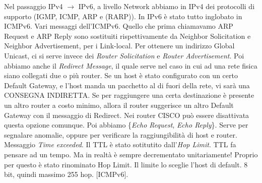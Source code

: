 Nel passaggio IPv4 $\rightarrow$ IPv6, a livello Network abbiamo in IPv4 dei protocolli di supporto (IGMP, ICMP, ARP e (RARP)). In IPv6 è stato tutto inglobato in ICMPv6. Vari messaggi dell'ICMPv6. Quello che prima chiamavamo ARP Request e ARP Reply sono sostituiti rispettivamente da Neighbor Solicitation e Neighbor Advertisement, per i Link-local. Per ottenere un indirizzo Global Unicast, ci si serve invece dei \textit{Router Solicitation} e \textit{Router Advertisement}. Poi abbiamo anche il \textit{Redirect Message}, il quale serve nel caso in cui ad una rete fisica siano collegati due o più router. Se un host è stato configurato con un certo Default Gateway, e l'host manda un pacchetto al di fuori della rete, vi sarà una CONSEGNA INDIRETTA. Se per raggiungere una certa destinazione è presente un altro router a costo minimo, allora il router suggerisce un altro Default Gateway con il messaggio di Redirect. Nei router CISCO può essere disattivata questa opzione comunque. Poi abbiamo \{\textit{Echo Request}, \textit{Echo Reply}\}. Serve per segnalare anomalie, oppure per verificare la raggiungibilità di host e router. Messaggio \textit{Time exceeded}. Il TTL è stato sotitutito dall'\textit{Hop Limit}. TTL fa pensare ad un tempo. Ma in realtà è sempre decrementato unitariamente! Proprio per questo è stato rinominato Hop Limit. Il limite lo sceglie l'host di default. 8 bit, quindi massimo 255 hop. [ICMPv6].

